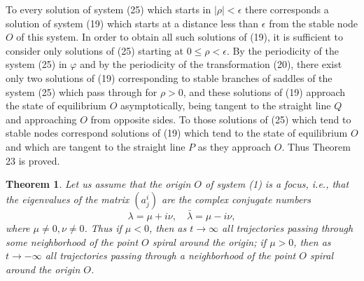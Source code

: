 \documentclass[10pt,a5paper]{book}
\theoremstyle{plain}
\newtheorem{theorem}{Theorem}
\theoremstyle{definition}
\theoremstyle{remark}
\begin{document}
To every solution of system (25) which starts in $|\rho|<\epsilon$ there corresponds a solution of system (19) which starts at a distance less than $\epsilon$ from the stable node $O$ of this system. In order to obtain all such solutions of (19), it is sufficient to consider only solutions of (25) starting at $0 \leq \rho<\epsilon$. By the periodicity of the system (25) in $\varphi$ and by the periodicity of the transformation (20), there exist only two solutions of (19) corresponding to stable branches of saddles of the system (25) which pass through for $\rho>0$, and these solutions of (19) approach the state of equilibrium $O$ asymptotically, being tangent to the straight line $Q$ and approaching $O$ from opposite sides. To those solutions of (25) which tend to stable nodes correspond solutions of (19) which tend to the state of equilibrium $O$ and which are tangent to the straight line $P$ as they approach $O$. Thus Theorem 23 is proved.

\begin{theorem}
Let us assume that the origin $O$ of system (1) is a focus, i.e., that the eigenvalues of the matrix $\left(a_{j}^{i}\right)$ are the complex conjugate numbers
\[
\lambda=\mu+i \nu, \quad \bar{\lambda}=\mu-i \nu,
\]
where $\mu \neq 0, \nu \neq 0$. Thus if $\mu<0$, then as $t \rightarrow \infty$ all trajectories passing through some neighborhood of the point $O$ spiral around the origin; if $\mu>0$, then as $t \rightarrow-\infty$ all trajectories passing through a neighborhood of the point $O$ spiral around the origin $O$.
\end{theorem}
\end{document}
